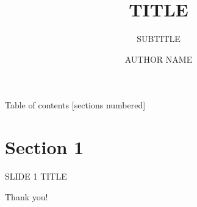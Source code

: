 \documentclass[10pt,xcolor={dvipsnames}]{beamer}
\title{TITLE}
\subtitle{SUBTITLE}
\date{}
\author{AUTHOR NAME}
\institute{INSTITUTE}
\begin{document}
\maketitle

\begin{frame}{Table of contents}
  [sections numbered]
  \tableofcontents%
\end{frame}

\section{Section 1}

\begin{frame}{SLIDE 1 TITLE}
\end{frame}


\begin{frame}[standout]
Thank you!
\end{frame}



%  

\end{document}
